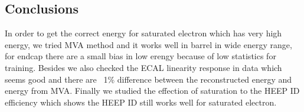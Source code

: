 \subsection{Conclusions}
In order to get the correct energy for saturated electron which has very high energy, we tried MVA method and it works well in barrel in wide energy range, for endcap there are a small bias in low erengy because of low statistics for training. Besides we also checked the ECAL linearity response in data which seems good and there are ~1\% difference between the reconstructed energy and energy from MVA. Finally we studied the effection of saturation to the HEEP ID efficiency which shows the HEEP ID still works well for saturated electron.
